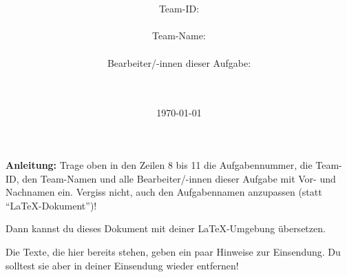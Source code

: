 \documentclass[a4paper,10pt,ngerman]{scrartcl}
\title{\textbf{\Huge\Aufgabe}}
\author{\LARGE Team-ID: \LARGE \TeamId \\\\
\LARGE Team-Name: \LARGE \TeamName \\\\
\LARGE Bearbeiter/-innen dieser Aufgabe: \\
\LARGE \Namen\\\\}
\date{\LARGE\today}
\begin{document}
    \maketitle
    \tableofcontents

    \vspace{0.5cm}

    \textbf{Anleitung:} Trage oben in den Zeilen 8 bis 11 die Aufgabennummer, die Team-ID, den Team-Namen und alle Bearbeiter/-innen dieser Aufgabe mit Vor- und Nachnamen ein.
    Vergiss nicht, auch den Aufgabennamen anzupassen (statt "`\LaTeX-Dokument"')!

    Dann kannst du dieses Dokument mit deiner \LaTeX-Umgebung übersetzen.

    Die Texte, die hier bereits stehen, geben ein paar Hinweise zur Einsendung.
    Du solltest sie aber in deiner Einsendung wieder entfernen!
\end{document}
